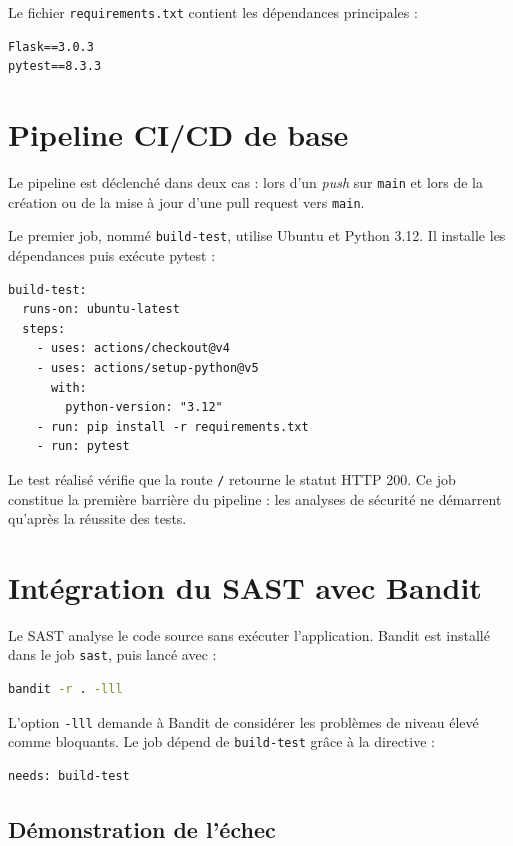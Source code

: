 \documentclass[12pt,a4paper]{article}
\begin{document}
Le fichier \texttt{requirements.txt} contient les dépendances principales :
\begin{lstlisting}[language={},caption={Dépendances Python}]
Flask==3.0.3
pytest==8.3.3
\end{lstlisting}

\section{Pipeline CI/CD de base}

Le pipeline est déclenché dans deux cas : lors d'un \textit{push} sur \texttt{main}
et lors de la création ou de la mise à jour d'une pull request vers \texttt{main}.

Le premier job, nommé \texttt{build-test}, utilise Ubuntu et Python 3.12. Il installe
les dépendances puis exécute pytest :
\begin{lstlisting}[language={},caption={Job de compilation logique et de tests}]
build-test:
  runs-on: ubuntu-latest
  steps:
    - uses: actions/checkout@v4
    - uses: actions/setup-python@v5
      with:
        python-version: "3.12"
    - run: pip install -r requirements.txt
    - run: pytest
\end{lstlisting}

Le test réalisé vérifie que la route \texttt{/} retourne le statut HTTP 200. Ce job
constitue la première barrière du pipeline : les analyses de sécurité ne démarrent
qu'après la réussite des tests.

\section{Intégration du SAST avec Bandit}

Le SAST analyse le code source sans exécuter l'application. Bandit est installé dans
le job \texttt{sast}, puis lancé avec :
\begin{lstlisting}[language=bash]
bandit -r . -lll
\end{lstlisting}

L'option \texttt{-lll} demande à Bandit de considérer les problèmes de niveau élevé
comme bloquants. Le job dépend de \texttt{build-test} grâce à la directive :
\begin{lstlisting}[language={}]
needs: build-test
\end{lstlisting}

\subsection{Démonstration de l'échec}
\end{document}
